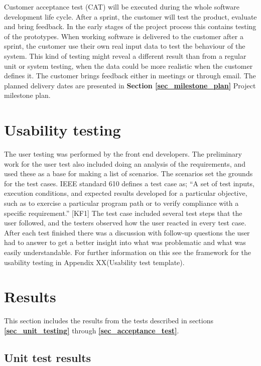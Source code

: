 Customer acceptance test (CAT) will be executed during the whole software development life cycle. After a sprint, the customer will test the product, evaluate and bring feedback. In the early stages of the project process this contains testing of the prototypes. When working software is delivered to the customer after a sprint, the customer use their own real input data to test the behaviour of the system. This kind of testing might reveal a different result than from a regular unit or system testing, when the data could be more realistic when the customer defines it. The customer brings feedback either in meetings or through email. The planned delivery dates are presented in \textbf{Section \ref{sec_milestone_plan}} Project milestone plan.  

\section{Usability testing}

The user testing was performed by the front end developers. The preliminary work for the user test also included doing an analysis of the requirements, and used these as a base for making a list of scenarios. The scenarios set the grounds for the test cases. IEEE standard 610 defines a test case as; “A set of test inputs, execution conditions, and expected results developed for a particular objective, such as to exercise a particular program path or to verify compliance with a specific requirement.” [KF1] 
The test case included several test steps that the user followed, and the testers observed how the user reacted in every test case. After each test finished there was a discussion with follow-up questions the user had to answer to get a better insight into what was problematic and what was easily understandable. For further information on this see the framework for the usability testing in Appendix XX(Usability test template).

\section{Results}
\label{sec_test_results}

This section includes the results from the tests described in sections \textbf{\ref{sec_unit_testing}} through \textbf{\ref{sec_acceptance_test}}.

\subsection{Unit test results}

